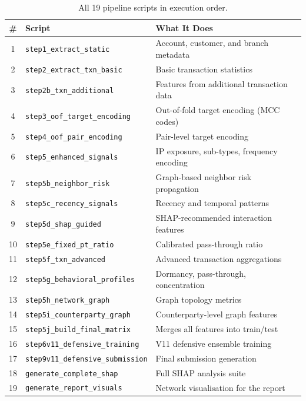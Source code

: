 \documentclass[11pt, a4paper]{article}
\begin{document}
\begin{table}[H]
\centering\small
\caption{All 19 pipeline scripts in execution order.}
\begin{tabular}{@{}cl p{6.5cm}@{}}
\toprule
\textbf{\#} & \textbf{Script} & \textbf{What It Does} \\
\midrule
1  & \texttt{step1\_extract\_static}        & Account, customer, and branch metadata \\
2  & \texttt{step2\_extract\_txn\_basic}     & Basic transaction statistics \\
3  & \texttt{step2b\_txn\_additional}        & Features from additional transaction data \\
4  & \texttt{step3\_oof\_target\_encoding}   & Out-of-fold target encoding (MCC codes) \\
5  & \texttt{step4\_oof\_pair\_encoding}     & Pair-level target encoding \\
6  & \texttt{step5\_enhanced\_signals}       & IP exposure, sub-types, frequency encoding \\
7  & \texttt{step5b\_neighbor\_risk}         & Graph-based neighbor risk propagation \\
8  & \texttt{step5c\_recency\_signals}       & Recency and temporal patterns \\
9  & \texttt{step5d\_shap\_guided}           & SHAP-recommended interaction features \\
10 & \texttt{step5e\_fixed\_pt\_ratio}       & Calibrated pass-through ratio \\
11 & \texttt{step5f\_txn\_advanced}          & Advanced transaction aggregations \\
12 & \texttt{step5g\_behavioral\_profiles}   & Dormancy, pass-through, concentration \\
13 & \texttt{step5h\_network\_graph}         & Graph topology metrics \\
14 & \texttt{step5i\_counterparty\_graph}    & Counterparty-level graph features \\
15 & \texttt{step5j\_build\_final\_matrix}   & Merges all features into train/test \\
\midrule
16 & \texttt{step6v11\_defensive\_training}  & V11 defensive ensemble training \\
17 & \texttt{step9v11\_defensive\_submission} & Final submission generation \\
\midrule
18 & \texttt{generate\_complete\_shap}       & Full SHAP analysis suite \\
19 & \texttt{generate\_report\_visuals}      & Network visualisation for the report \\
\bottomrule
\end{tabular}
\end{table}
\end{document}

